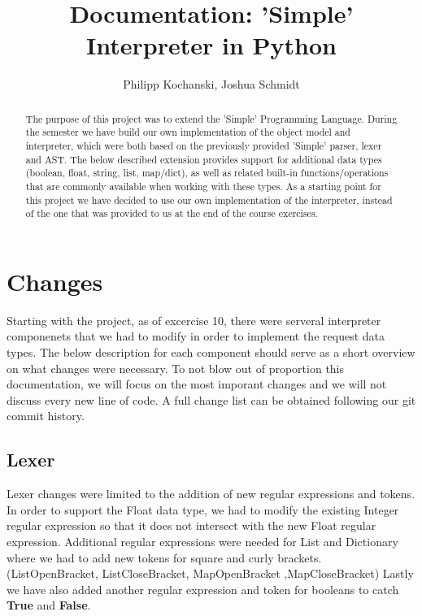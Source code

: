 \documentclass{article}
\begin{document}
\title{Documentation: 'Simple' Interpreter in Python}
\author{Philipp Kochanski, Joshua Schmidt}

\maketitle

\begin{abstract}
The purpose of this project was to extend the 'Simple' Programming Language.
During the semester we have build our own implementation of the object model and interpreter, which were both based
on the previously provided 'Simple' parser, lexer and AST. The below described extension provides support for additional data types (boolean, float, string, list, map/dict), as well as related built-in functions/operations that are commonly available when working with these types. As a starting point for this project we have decided to use our own implementation of the interpreter, instead of the one that was provided to us at the end of the course exercises. 
\end{abstract}

\section{Changes}
Starting with the project, as of excercise 10, there were serveral interpreter componenets that we had to modify in order to implement the request data types. The below description for each component should serve as a short overview on what changes were necessary. To not blow out of proportion this documentation, we will focus on the most imporant changes and we will not discuss every new line of code. A full change list can be obtained following our git commit history.

\subsection{Lexer}
Lexer changes were limited to the addition of new regular expressions and tokens. In order to support the Float data type, we had to modify the existing Integer regular expression so that it does not intersect with the new Float regular expression. Additional regular expressions were needed for List and Dictionary where we had to add new tokens for square and curly brackets. (ListOpenBracket, ListCloseBracket, MapOpenBracket ,MapCloseBracket) Lastly we have also added another regular expression and token for booleans to catch \textbf{True} and \textbf{False}.
\end{document}
